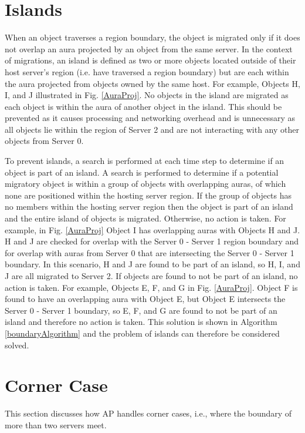 \section{Islands}
When an object traverses a region boundary, the object is migrated only if it does not overlap an aura projected by an object from the same server. In the context of migrations, an island is defined as two or more objects located outside of their host server's region (i.e. have traversed a region boundary) but are each within the aura projected from objects owned by the same host. For example, Objects H, I, and J illustrated in Fig. \ref{AuraProj}. No objects in the island are migrated as each object is within the aura of another object in the island. This should be prevented as it causes processing and networking overhead and is unnecessary as all objects lie within the region of Server 2 and are not interacting with any other objects from Server 0. 

To prevent islands, a search is performed at each time step to determine if an object is part of an island. A search is performed to determine if a potential migratory object is within a group of objects with overlapping auras, of which none are positioned within the hosting server region. If the group of objects has no members within the hosting server region then the object is part of an island and the entire island of objects is migrated. Otherwise, no action is taken. For example, in Fig. \ref{AuraProj} Object I has overlapping auras with Objects H and J. H and J are checked for overlap with the Server 0 - Server 1 region boundary and for overlap with auras from Server 0 that are intersecting the Server 0 - Server 1 boundary. In this scenario, H and J are found to be part of an island, so H, I, and J are all migrated to Server 2. If objects are found to not be part of an island, no action is taken. For example, Objects E, F, and G in Fig. \ref{AuraProj}. Object F is found to have an overlapping aura with Object E, but Object E intersects the Server 0 - Server 1 boundary, so E, F, and G are found to not be part of an island and therefore no action is taken. This solution is shown in Algorithm \ref{boundaryAlgorithm} and the problem of islands can therefore be considered solved.

\section{Corner Case}
This section discusses how AP handles corner cases, i.e., where the boundary of more than two servers meet. 

